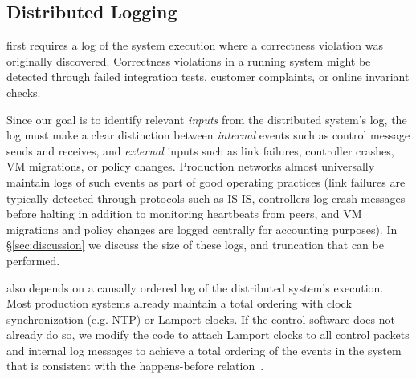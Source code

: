 {\subsection{Distributed Logging}

\Simulator{} first requires a log of the system execution where a
correctness violation was originally discovered. Correctness violations
in a running system might be detected through failed integration tests,
customer complaints, or online invariant checks. 

Since our goal is to identify
relevant {\em inputs} from the distributed system's log, the log must make a clear
distinction between {\em internal} events such as control message sends and
receives, and {\em external} inputs such as
link failures, controller crashes, VM migrations, or policy changes.
Production networks almost universally maintain logs of such events as part of
good operating practices (link failures are typically detected through
protocols such as IS-IS,
controllers log crash messages before
halting in addition to monitoring heartbeats from peers, and VM migrations and
policy changes are logged centrally for accounting purposes). In
\S\ref{sec:discussion} we discuss the size of these logs, and truncation that can be
performed.

\Simulator{} also depends on a causally ordered log of the
distributed system's execution. Most production systems already maintain a
total ordering with clock synchronization (e.g. NTP) or Lamport clocks. If the control software does not already do
so, we modify the code to attach Lamport
clocks to all
control packets and internal log messages
to achieve a total ordering of the events in the system that
is consistent with the happens-before
relation~\cite{Lamport:1978:TCO:359545.359563}.


%
%

}
